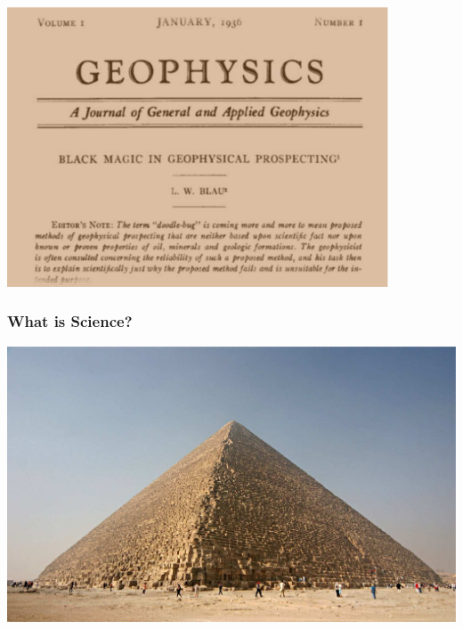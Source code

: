 \begin{frame}
\begin{center}
\vfill
\includegraphics[width=0.85\textwidth]{Fig/blackmagic}
\vfill
\end{center}
\end{frame}





\begin{frame}
\frametitle{What is Science?}

\begin{center}
\includegraphics[height=0.8\textheight]{Fig/Kheops-Pyramid}
\end{center}
\end{frame}

